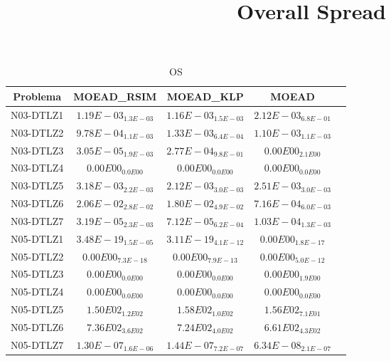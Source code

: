 \documentclass{article}
\title{Overall Spread}
\author{}
\begin{document}
\maketitle
\begin{table*}[ht!]
\scriptsize
\caption{OS}
\centering\begin{tabular}{|c||c||c||c||c|} \hline
Problema &MOEAD_RSIM &MOEAD_KLP &MOEAD\\\hline
N03-DTLZ1 &\cellcolor{gray25}$1.19E-03_{1.3E-03}$ &$1.16E-03_{1.5E-03}$ &\cellcolor{gray95}$2.12E-03_{6.8E-01}$\\ 
\hline
N03-DTLZ2 &$9.78E-04_{1.1E-03}$ &\cellcolor{gray95}$1.33E-03_{6.4E-04}$ &\cellcolor{gray25}$1.10E-03_{1.1E-03}$\\ 
\hline
N03-DTLZ3 &\cellcolor{gray25}$3.05E-05_{1.9E-03}$ &\cellcolor{gray95}$2.77E-04_{9.8E-01}$ &$0.00E00_{2.1E00}$\\ 
\hline
N03-DTLZ4 &\cellcolor{gray95}$0.00E00_{0.0E00}$ &\cellcolor{gray25}$0.00E00_{0.0E00}$ &$0.00E00_{0.0E00}$\\ 
\hline
N03-DTLZ5 &\cellcolor{gray95}$3.18E-03_{2.2E-03}$ &$2.12E-03_{3.0E-03}$ &\cellcolor{gray25}$2.51E-03_{3.0E-03}$\\ 
\hline
N03-DTLZ6 &\cellcolor{gray95}$2.06E-02_{2.8E-02}$ &\cellcolor{gray25}$1.80E-02_{4.9E-02}$ &$7.16E-04_{6.0E-03}$\\ 
\hline
N03-DTLZ7 &$3.19E-05_{2.3E-03}$ &\cellcolor{gray25}$7.12E-05_{6.2E-04}$ &\cellcolor{gray95}$1.03E-04_{1.3E-03}$\\ 
\hline
N05-DTLZ1 &\cellcolor{gray95}$3.48E-19_{1.5E-05}$ &\cellcolor{gray25}$3.11E-19_{4.1E-12}$ &$0.00E00_{1.8E-17}$\\ 
\hline
N05-DTLZ2 &\cellcolor{gray95}$0.00E00_{7.3E-18}$ &\cellcolor{gray25}$0.00E00_{7.9E-13}$ &$0.00E00_{5.0E-12}$\\ 
\hline
N05-DTLZ3 &\cellcolor{gray95}$0.00E00_{0.0E00}$ &\cellcolor{gray25}$0.00E00_{0.0E00}$ &$0.00E00_{1.9E00}$\\ 
\hline
N05-DTLZ4 &\cellcolor{gray95}$0.00E00_{0.0E00}$ &\cellcolor{gray25}$0.00E00_{0.0E00}$ &$0.00E00_{0.0E00}$\\ 
\hline
N05-DTLZ5 &$1.50E02_{1.2E02}$ &\cellcolor{gray95}$1.58E02_{1.0E02}$ &\cellcolor{gray25}$1.56E02_{7.1E01}$\\ 
\hline
N05-DTLZ6 &\cellcolor{gray95}$7.36E02_{3.6E02}$ &\cellcolor{gray25}$7.24E02_{4.0E02}$ &$6.61E02_{4.3E02}$\\ 
\hline
N05-DTLZ7 &\cellcolor{gray25}$1.30E-07_{1.6E-06}$ &\cellcolor{gray95}$1.44E-07_{7.2E-07}$ &$6.34E-08_{2.1E-07}$\\ 

\end{tabular}
\end{table*}
\end{document}
